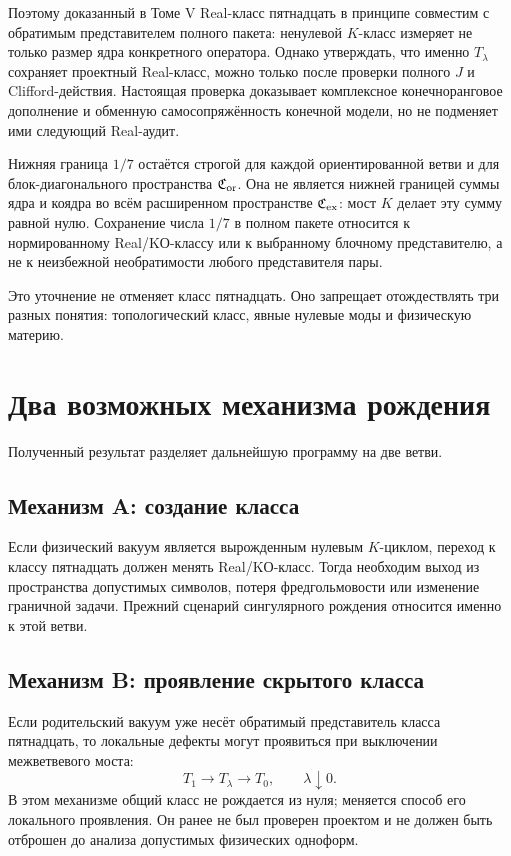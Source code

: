 Поэтому доказанный в Томе V Real-класс пятнадцать в принципе совместим с
обратимым представителем полного пакета: ненулевой $K$-класс измеряет не
только размер ядра конкретного оператора. Однако утверждать, что именно
$T_\lambda$ сохраняет проектный Real-класс, можно только после проверки
полного $J$ и Clifford-действия. Настоящая проверка доказывает комплексное
конечноранговое дополнение и обменную самосопряжённость конечной модели,
но не подменяет ими следующий Real-аудит.

\begin{proposition}
Нижняя граница $1/7$ остаётся строгой для каждой ориентированной ветви и
для блок-диагонального пространства $\mathfrak C_{\rm or}$. Она не является
нижней границей суммы ядра и коядра во всём расширенном пространстве
$\mathfrak C_{\rm ex}$: мост $K$ делает эту сумму равной нулю. Сохранение
числа $1/7$ в полном пакете относится к нормированному Real/KО-классу или
к выбранному блочному представителю, а не к неизбежной необратимости
любого представителя пары.
\end{proposition}

Это уточнение не отменяет класс пятнадцать. Оно запрещает отождествлять
три разных понятия: топологический класс, явные нулевые моды и физическую
материю.

\section{Два возможных механизма рождения}

Полученный результат разделяет дальнейшую программу на две ветви.

\subsection*{Механизм A: создание класса}

Если физический вакуум является вырожденным нулевым $K$-циклом, переход к
классу пятнадцать должен менять Real/KО-класс. Тогда необходим выход из
пространства допустимых символов, потеря фредгольмовости или изменение
граничной задачи. Прежний сценарий сингулярного рождения относится именно
к этой ветви.

\subsection*{Механизм B: проявление скрытого класса}

Если родительский вакуум уже несёт обратимый представитель класса
пятнадцать, то локальные дефекты могут проявиться при выключении
межветвевого моста:
\begin{equation}
 T_1\longrightarrow T_\lambda\longrightarrow T_0,
 \qquad \lambda\downarrow0.
 \end{equation}
В этом механизме общий класс не рождается из нуля; меняется способ его
локального проявления. Он ранее не был проверен проектом и не должен быть
отброшен до анализа допустимых физических одноформ.

